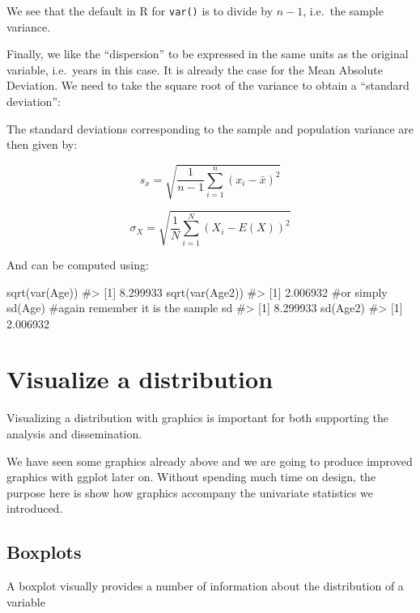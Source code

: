 \documentclass[
  letterpaper,
  DIV=11,
  numbers=noendperiod]{scrreprt}
\newenvironment{Shaded}{\begin{snugshade}}{\end{snugshade}}
\newcommand{\CommentTok}[1]{\textcolor[rgb]{0.37,0.37,0.37}{#1}}
\newcommand{\FunctionTok}[1]{\textcolor[rgb]{0.28,0.35,0.67}{#1}}
\newcommand{\NormalTok}[1]{\textcolor[rgb]{0.00,0.23,0.31}{#1}}
\begin{document}
We see that the default in R for \texttt{var()} is to divide by \(n-1\),
i.e.~the sample variance.

Finally, we like the ``dispersion'' to be expressed in the same units as
the original variable, i.e.~years in this case. It is already the case
for the Mean Absolute Deviation. We need to take the square root of the
variance to obtain a ``standard deviation'':

The standard deviations corresponding to the sample and population
variance are then given by:

\[s_x = \sqrt{\dfrac{1}{n-1} \sum_{i=1}^n (x_i-\bar{x})^2}\]

\[\sigma_X = \sqrt{\dfrac{1}{N} \sum_{i=1}^N (X_i-E(X))^2}\]

And can be computed using:

\begin{Shaded}
\begin{Highlighting}[]
\FunctionTok{sqrt}\NormalTok{(}\FunctionTok{var}\NormalTok{(Age))}
\CommentTok{\#\textgreater{} [1] 8.299933}
\FunctionTok{sqrt}\NormalTok{(}\FunctionTok{var}\NormalTok{(Age2))}
\CommentTok{\#\textgreater{} [1] 2.006932}
\CommentTok{\#or simply}
\FunctionTok{sd}\NormalTok{(Age) }\CommentTok{\#again remember it is the sample sd}
\CommentTok{\#\textgreater{} [1] 8.299933}
\FunctionTok{sd}\NormalTok{(Age2)}
\CommentTok{\#\textgreater{} [1] 2.006932}
\end{Highlighting}
\end{Shaded}

\section{Visualize a distribution}\label{visualize-a-distribution}

Visualizing a distribution with graphics is important for both
supporting the analysis and dissemination.

We have seen some graphics already above and we are going to produce
improved graphics with ggplot later on. Without spending much time on
design, the purpose here is show how graphics accompany the univariate
statistics we introduced.

\subsection{Boxplots}\label{boxplots}

A boxplot visually provides a number of information about the
distribution of a variable
\end{document}
